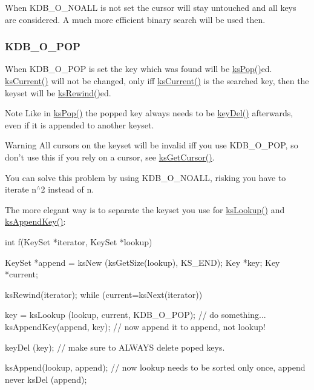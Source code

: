 When KDB\_\-O\_\-NOALL is not set the cursor will stay untouched and all keys are considered. A much more efficient binary search will be used then.\hypertarget{group__keyset_KDB_O_POP}{}\subsubsection{KDB\_\-O\_\-POP}\label{group__keyset_KDB_O_POP}
When KDB\_\-O\_\-POP is set the key which was found will be \hyperlink{group__keyset_gae42530b04defb772059de0600159cf69}{ksPop()}ed. \hyperlink{group__keyset_ga4287b9416912c5f2ab9c195cb74fb094}{ksCurrent()} will not be changed, only iff \hyperlink{group__keyset_ga4287b9416912c5f2ab9c195cb74fb094}{ksCurrent()} is the searched key, then the keyset will be \hyperlink{group__keyset_gabe793ff51f1728e3429c84a8a9086b70}{ksRewind()}ed.

\begin{DoxyNote}{Note}
Like in \hyperlink{group__keyset_gae42530b04defb772059de0600159cf69}{ksPop()} the popped key always needs to be \hyperlink{group__key_ga3df95bbc2494e3e6703ece5639be5bb1}{keyDel()} afterwards, even if it is appended to another keyset.
\end{DoxyNote}
\begin{DoxyWarning}{Warning}
All cursors on the keyset will be invalid iff you use KDB\_\-O\_\-POP, so don't use this if you rely on a cursor, see \hyperlink{group__keyset_gaffe507ab9281c322eb16c3e992075d29}{ksGetCursor()}.
\end{DoxyWarning}
You can solve this problem by using KDB\_\-O\_\-NOALL, risking you have to iterate n$^\wedge$2 instead of n.

The more elegant way is to separate the keyset you use for \hyperlink{group__keyset_gaa34fc43a081e6b01e4120daa6c112004}{ksLookup()} and \hyperlink{group__keyset_gaa5a1d467a4d71041edce68ea7748ce45}{ksAppendKey()}: 
\begin{DoxyCode}
int f(KeySet *iterator, KeySet *lookup)
{
        KeySet *append = ksNew (ksGetSize(lookup), KS_END);
        Key *key;
        Key *current;

        ksRewind(iterator);
        while (current=ksNext(iterator))
        {
                key = ksLookup (lookup, current, KDB_O_POP);
                // do something...
                ksAppendKey(append, key); // now append it to append, not lookup!
      
                keyDel (key); // make sure to ALWAYS delete poped keys.
        }
        ksAppend(lookup, append);
        // now lookup needs to be sorted only once, append never
        ksDel (append);
}
\end{DoxyCode}



